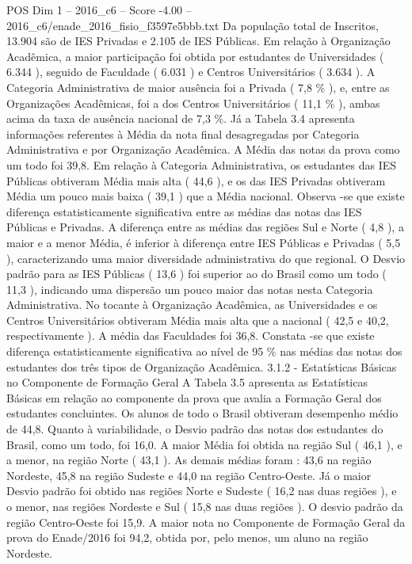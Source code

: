 \begin{textsample}{POS Dim 1 – 2016\_c6 – Score -4.00 – 2016\_c6/enade\_2016\_fisio\_f3597e5bbb.txt}
Da população total de Inscritos, 13.904 são de IES Privadas e 2.105 de IES Públicas.
Em relação à Organização Acadêmica, a maior participação foi obtida por estudantes de Universidades ( 6.344 ), seguido de Faculdade ( 6.031 ) e Centros Universitários ( 3.634 ).
A Categoria Administrativa de maior ausência foi a Privada ( 7,8 \% ), e, entre as Organizações Acadêmicas, foi a dos Centros Universitários ( 11,1 \% ), ambas acima da taxa de ausência nacional de 7,3 \%.
Já a Tabela 3.4 apresenta informações referentes à Média da nota final desagregadas por Categoria Administrativa e por Organização Acadêmica.
A Média das notas da prova como um todo foi 39,8.
Em relação à Categoria Administrativa, os estudantes das IES Públicas obtiveram Média mais alta ( 44,6 ), e os das IES Privadas obtiveram Média um pouco mais baixa ( 39,1 ) que a Média nacional.
Observa -se que existe diferença estatisticamente significativa entre as médias das notas das IES Públicas e Privadas.
A diferença entre as médias das regiões Sul e Norte ( 4,8 ), a maior e a menor Média, é inferior à diferença entre IES Públicas e Privadas ( 5,5 ), caracterizando uma maior diversidade administrativa do que regional.
O Desvio padrão para as IES Públicas ( 13,6 ) foi superior ao do Brasil como um todo ( 11,3 ), indicando uma dispersão um pouco maior das notas nesta Categoria Administrativa.
No tocante à Organização Acadêmica, as Universidades e os Centros Universitários obtiveram Média mais alta que a nacional ( 42,5 e 40,2, respectivamente ).
A média das Faculdades foi 36,8.
Constata -se que existe diferença estatisticamente significativa ao nível de 95 \% nas médias das notas dos estudantes dos três tipos de Organização Acadêmica. 3.1.2 - Estatísticas Básicas no Componente de Formação Geral A Tabela 3.5 apresenta as Estatísticas Básicas em relação ao componente da prova que avalia a Formação Geral dos estudantes concluintes.
Os alunos de todo o Brasil obtiveram desempenho médio de 44,8.
Quanto à variabilidade, o Desvio padrão das notas dos estudantes do Brasil, como um todo, foi 16,0.
A maior Média foi obtida na região Sul ( 46,1 ), e a menor, na região Norte ( 43,1 ).
As demais médias foram : 43,6 na região Nordeste, 45,8 na região Sudeste e 44,0 na região Centro-Oeste.
Já o maior Desvio padrão foi obtido nas regiões Norte e Sudeste ( 16,2 nas duas regiões ), e o menor, nas regiões Nordeste e Sul ( 15,8 nas duas regiões ).
O desvio padrão da região Centro-Oeste foi 15,9.
A maior nota no Componente de Formação Geral da prova do Enade/2016 foi 94,2, obtida por, pelo menos, um aluno na região Nordeste.

\end{textsample}
